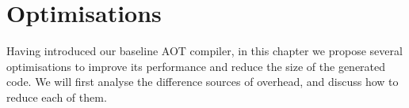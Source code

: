 \chapter{Optimisations}
\label{sec-optimisations}
Having introduced our baseline AOT compiler, in this chapter we propose several optimisations to improve its performance and reduce the size of the generated code. We will first analyse the difference sources of overhead, and discuss how to reduce each of them.

